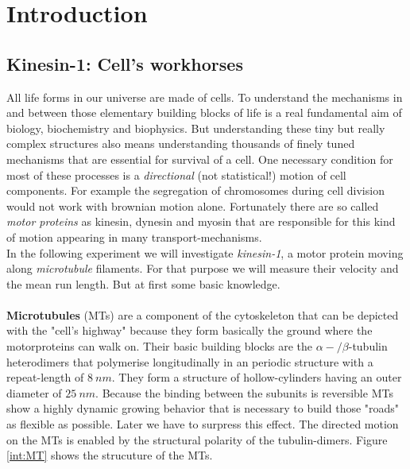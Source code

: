 \section{Introduction}
	\subsection{Kinesin-1: Cell's workhorses}
		All life forms in our universe are made of cells. To understand the mechanisms in and between those elementary building blocks of life is a real fundamental aim of biology, biochemistry and biophysics. But understanding these tiny but really complex structures also means understanding thousands of finely tuned mechanisms that are essential for survival of a cell. One necessary condition for most of these processes is a \textit{directional} (not statistical!) motion of cell components. For example the segregation of chromosomes during cell division would not work with brownian motion alone. Fortunately there are so called \textit{motor proteins} as kinesin, dynesin and myosin that are responsible for this kind of motion appearing in many transport-mechanisms.\\
		In the following experiment we will investigate \textit{kinesin-1}, a motor protein moving along \textit{microtubule} filaments. For that purpose we will measure their velocity and the mean run length. But at first some basic knowledge.\\
		\ \\
		\textbf{Microtubules} (MTs) are a component of the cytoskeleton that can be depicted with the "cell's highway" because they form basically the ground where the motorproteins can walk on. Their basic building blocks are the $\alpha-/\beta$-tubulin heterodimers that polymerise longitudinally in an periodic structure with a repeat-length of $8\ \unit{nm}$. They form a structure of hollow-cylinders having an outer diameter of $25\ \unit{nm}$. Because the binding between the subunits is reversible MTs show a highly dynamic growing behavior that is necessary to build those "roads" as flexible as possible. Later we have to surpress this effect. The directed motion on the MTs is enabled by the structural polarity of the tubulin-dimers. Figure \ref{int:MT} shows the strucuture of the MTs.\cite{PA}\\
